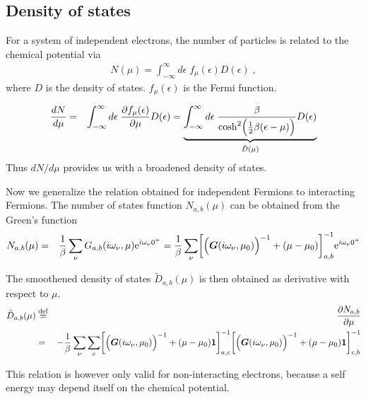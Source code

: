 \documentclass[11pt,a4paper]{report}
\begin{document}
\subsection{Density of states}
For a system of independent electrons, the number of particles is
related to the chemical potential via
\begin{eqnarray}
N(\mu)=\int_{-\infty}^\infty d\epsilon\; f_\mu(\epsilon) D(\epsilon)
\;,
\end{eqnarray}
where $D$ is the density of states. $f_\mu(\epsilon)$ is the Fermi function.

\begin{eqnarray}
\frac{dN}{d\mu}
&=&\int_{-\infty}^\infty d\epsilon\; 
\frac{\partial f_\mu(\epsilon)}{\partial\mu} D(\epsilon)
=
\underbrace{\int_{-\infty}^\infty d\epsilon\; 
\frac{\beta}{\cosh^2\Bigl(\frac{1}{2}\beta(\epsilon-\mu)\Bigr)} D(\epsilon)
}_{\tilde{D}(\mu)}
\end{eqnarray}
Thus $dN/d\mu$ provides us with a broadened density of states.

Now we generalize the relation obtained for independent Fermions to
interacting Fermions. The number of states function $N_{a,b}(\mu)$ can
be obtained from the Green's function
\begin{eqnarray}
N_{a,b}(\mu)
&=&\frac{1}{\beta}\sum_\nu G_{a,b}(i\omega_\nu,\mu)\mathrm{e}^{i\omega_\nu0^+}
=\frac{1}{\beta}\sum_\nu 
\biggl[
\Bigl(\bm{G}(i\omega_\nu,\mu_0)
\Bigr)^{-1}+(\mu-\mu_0)\biggr]^{-1}_{a,b}\mathrm{e}^{i\omega_\nu0^+}
\end{eqnarray}

The smoothened density of states $\tilde{D}_{a,b}(\mu)$ is then
obtained as derivative with respect to $\mu$.
\begin{eqnarray}
\tilde{D}_{a,b}(\mu)&\stackrel{\text{def}}{=}&\frac{\partial N_{a,b}}{\partial\mu}
\nonumber\\
&=&
-\frac{1}{\beta}\sum_\nu 
\sum_c
\biggl[
\Bigl(\bm{G}(i\omega_\nu,\mu_0)
\Bigr)^{-1}+(\mu-\mu_0)\bm{1}\biggr]^{-1}_{a,c}
\biggl[
\Bigl(\bm{G}(i\omega_\nu,\mu_0)
\Bigr)^{-1}+(\mu-\mu_0)\bm{1}\biggr]^{-1}_{c,b}
\nonumber\\
\end{eqnarray}

This relation is however only valid for non-interacting electrons,
because a self energy may depend itself on the chemical potential.

\end{document}
